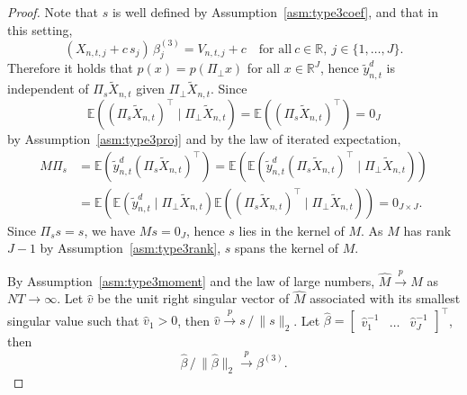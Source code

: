 \documentclass[preprint,12pt,authoryear]{elsarticle}
\newcommand{\pto}{\xrightarrow{p}}
\newcommand{\R}{\mathbb{R}}
\newcommand{\E}{\mathbb{E}}
\newcommand{\norm}[1]{\ensuremath{\lVert #1\rVert_2}}
\begin{document}
\begin{proof}
Note that $s$ is well defined by Assumption~\ref{asm:type3coef},
and that in this setting, $$(X_{n,t,j}+c\,s_j)\,\beta^{(3)}_j=V_{n,t,j}+c \quad \text{for all}~c \in \R,\ j\in\{1,\dots,J\}.$$ Therefore it holds that $p(x)=p(\Pi_\perp x)$ for all $x\in\R^J$, hence $\tilde{y}^d_{n,t}$ is independent of $\Pi_s \tilde{X}_{n,t}$ given $\Pi_\perp \tilde{X}_{n,t}$.
Since $$\E\left((\Pi_s \tilde{X}_{n,t})^\top \mid \Pi_\perp \tilde{X}_{n,t}\right) = \E \left((\Pi_s \tilde{X}_{n,t})^\top \right) = 0_{J}$$
by Assumption~\ref{asm:type3proj}
and by the law of iterated expectation,
%
\begin{align*}
    M \Pi_s &= \E \left(\tilde{y}_{n,t}^d (\Pi_s \tilde{X}_{n,t})^\top \right) = \E \left( \E(\tilde{y}_{n,t}^d (\Pi_s \tilde{X}_{n,t})^\top \mid \Pi_\perp \tilde{X}_{n,t}) \right) \\
    &= \E \left( \E(\tilde{y}_{n,t}^d \mid \Pi_\perp \tilde{X}_{n,t}) \E((\Pi_s \tilde{X}_{n,t})^\top \mid \Pi_\perp \tilde{X}_{n,t}) \right) = 0_{J \times J}.
\end{align*}
%
Since $\Pi_s s = s$, we have $M s = 0_{J}$, hence $s$ lies in the kernel of $M$. As $M$ has rank $J - 1$ by Assumption~\ref{asm:type3rank}, $s$ spans the kernel of $M$.

By Assumption~\ref{asm:type3moment}
and the law of large numbers, $\widehat{M} \pto M$ as $NT\to\infty$. Let $\hat v$ be the unit right singular vector of $\widehat{M}$ associated with its smallest singular value such that $\hat v_1 > 0$, then $\hat v \pto s\, /\, \norm{s}$. Let
$\hat\beta = \begin{bmatrix} \hat v_1^{-1} & \dots & \hat v_J^{-1} \end{bmatrix}^\top$, then $$ \hat{\beta} \, / \, \norm{\hat{\beta}} \pto \beta^{(3)}.$$
\end{proof}
\end{document}
